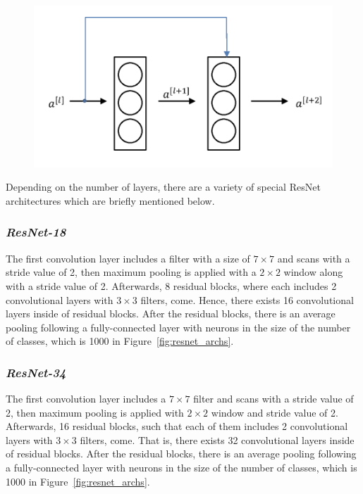 \begin{figure}[h]
    \centering
    \includegraphics[width=.6\linewidth]{fig/residual_block.png}
    \label{fig:residual_block}
\end{figure}

Depending on the number of layers, there are a variety of special ResNet architectures which are briefly mentioned below.

\subsubsection*{\textit{ResNet-18}}

The first convolution layer includes a filter with a size of $7 \times 7$ and scans with a stride value of 2, then maximum pooling is applied with a $2 \times 2$ window along with a stride value of 2. Afterwards, 8 residual blocks, where each includes 2 convolutional layers with $3 \times 3$ filters, come. Hence, there exists 16 convolutional layers inside of residual blocks. After the residual blocks, there is an average pooling following a fully-connected layer with neurons in the size of the number of classes, which is 1000 in Figure~\ref{fig:resnet_archs}.

\subsubsection*{\textit{ResNet-34}}

The first convolution layer includes a $7 \times  7$ filter and scans with a stride value of 2, then maximum pooling is applied with $2 \times  2$ window and stride value of 2. Afterwards, 16 residual blocks, such that each of them includes 2 convolutional layers with $3 \times 3$ filters, come. That is, there exists 32 convolutional layers inside of residual blocks. After the residual blocks, there is an average pooling following a fully-connected layer with neurons in the size of the number of classes, which is 1000 in Figure~\ref{fig:resnet_archs}.

